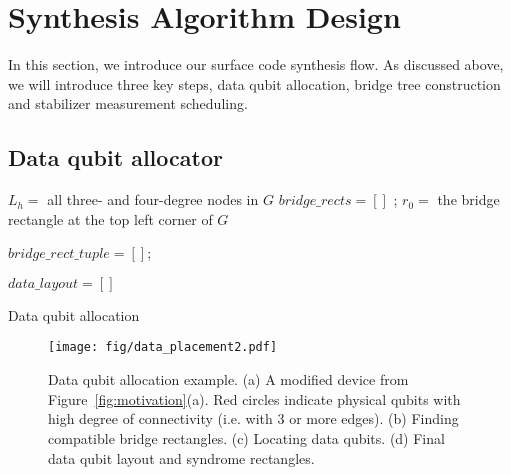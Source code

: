 \section{Synthesis Algorithm Design}
\label{sect:algorithm}
In this section, we introduce our surface code synthesis flow. As discussed above, we will introduce three key steps, data qubit allocation, bridge tree construction and stabilizer measurement scheduling.

\subsection{Data qubit allocator}
\label{sect:map_data}

\begin{algorithm}[h]\footnotesize
\SetAlgoLined
{}

$L_h =$ all three- and four-degree nodes in $G$\;
$bridge\_rects = []$ ;  
$r_0 =$ the bridge rectangle at the top left corner of $G$\;

$bridge\_rect\_tuple = []$; 


$data\_layout = []$\;
\caption{Data qubit allocation}
\label{alg:map_data_qubits}
\end{algorithm}

\begin{figure*}[ht!]
    \centering
    \texttt{[image: fig/data\_placement2.pdf]}
    \caption{ Data qubit allocation example. (a) A modified device from Figure~\ref{fig:motivation}(a). Red circles indicate physical qubits with high degree of connectivity (i.e. with 3 or more edges). (b) Finding compatible bridge rectangles. (c) Locating data qubits. (d) Final data qubit layout and syndrome rectangles. }
    \label{fig:data_placement}
\end{figure*}

